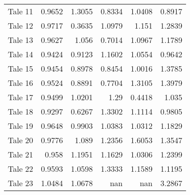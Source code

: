 \begin{table}[h]
\begin{tabular}{lrrrrr}
 Tale 11 &                        0.9652 &                      1.3055 &                        0.8334 &                          1.0408 &                         0.8917 \\
 Tale 12 &                        0.9717 &                      0.3635 &                        1.0979 &                          1.151  &                         1.2839 \\
 Tale 13 &                        0.9627 &                      1.056  &                        0.7014 &                          1.0967 &                         1.1789 \\
 Tale 14 &                        0.9424 &                      0.9123 &                        1.1602 &                          1.0554 &                         0.9642 \\
 Tale 15 &                        0.9454 &                      0.8978 &                        0.8454 &                          1.0016 &                         1.3785 \\
 Tale 16 &                        0.9524 &                      0.8891 &                        0.7704 &                          1.3105 &                         1.3979 \\
 Tale 17 &                        0.9499 &                      1.0201 &                        1.29   &                          0.4418 &                         1.035  \\
 Tale 18 &                        0.9297 &                      0.6267 &                        1.3302 &                          1.1114 &                         0.9805 \\
 Tale 19 &                        0.9648 &                      0.9903 &                        1.0383 &                          1.0312 &                         1.1829 \\
 Tale 20 &                        0.9776 &                      1.089  &                        1.2356 &                          1.6053 &                         1.3547 \\
 Tale 21 &                        0.958  &                      1.1951 &                        1.1629 &                          1.0306 &                         1.2399 \\
 Tale 22 &                        0.9593 &                      1.0598 &                        1.3333 &                          1.1589 &                         1.1195 \\
 Tale 23 &                        1.0484 &                      1.0678 &                      nan      &                        nan      &                         3.2867 \\

\end{tabular}
\end{table}
